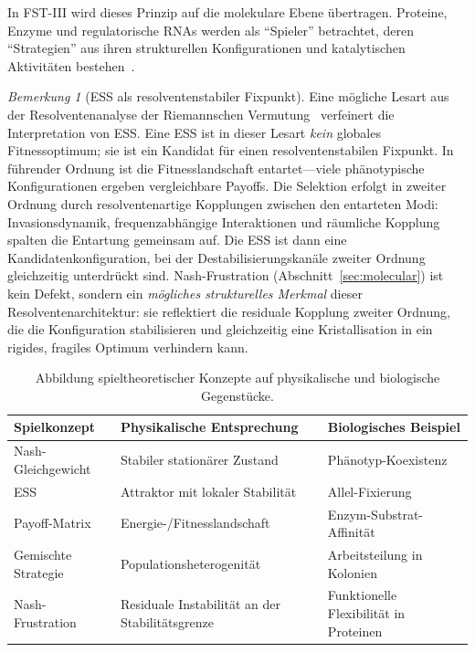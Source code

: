 \documentclass[12pt,a4paper]{article}
\theoremstyle{remark}
\newtheorem{remark}{Bemerkung}
\begin{document}
In FST-III wird dieses Prinzip auf die molekulare Ebene übertragen. Proteine, Enzyme und regulatorische RNAs werden als ``Spieler'' betrachtet, deren ``Strategien'' aus ihren strukturellen Konfigurationen und katalytischen Aktivitäten bestehen~\citep{GameBiochemistry}.

\begin{remark}[ESS als resolventenstabiler Fixpunkt]
\label{rem:ess-resolvent}
Eine mögliche Lesart aus der Resolventenanalyse der Riemannschen Vermutung~\citep{GeigerRH2026b} verfeinert die Interpretation von ESS. Eine ESS ist in dieser Lesart \emph{kein} globales Fitnessoptimum; sie ist ein Kandidat für einen resolventenstabilen Fixpunkt. In führender Ordnung ist die Fitnesslandschaft entartet---viele phänotypische Konfigurationen ergeben vergleichbare Payoffs. Die Selektion erfolgt in zweiter Ordnung durch resolventenartige Kopplungen zwischen den entarteten Modi: Invasionsdynamik, frequenzabhängige Interaktionen und räumliche Kopplung spalten die Entartung gemeinsam auf. Die ESS ist dann eine Kandidatenkonfiguration, bei der Destabilisierungskanäle zweiter Ordnung gleichzeitig unterdrückt sind. Nash-Frustration (Abschnitt~\ref{sec:molecular}) ist kein Defekt, sondern ein \emph{mögliches strukturelles Merkmal} dieser Resolventenarchitektur: sie reflektiert die residuale Kopplung zweiter Ordnung, die die Konfiguration stabilisieren und gleichzeitig eine Kristallisation in ein rigides, fragiles Optimum verhindern kann.
\end{remark}

\begin{table}[htbp]
\centering
\caption{Abbildung spieltheoretischer Konzepte auf physikalische und biologische Gegenstücke.}
\label{tab:game-biology-mapping}
\begin{tabularx}{\textwidth}{@{}L{0.18\textwidth} L{0.29\textwidth} Y@{}}
\toprule
\textbf{Spielkonzept} & \textbf{Physikalische Entsprechung} & \textbf{Biologisches Beispiel} \\
\midrule
Nash-Gleichgewicht & Stabiler stationärer Zustand & Phänotyp-Koexistenz \\
ESS & Attraktor mit lokaler Stabilität & Allel-Fixierung \\
Payoff-Matrix & Energie-/Fitnesslandschaft & Enzym-Substrat-Affinität \\
Gemischte Strategie & Populationsheterogenität & Arbeitsteilung in Kolonien \\
Nash-Frustration & Residuale Instabilität an der Stabilitätsgrenze & Funktionelle Flexibilität in Proteinen \\
\bottomrule
\end{tabularx}
\end{table}
\end{document}
